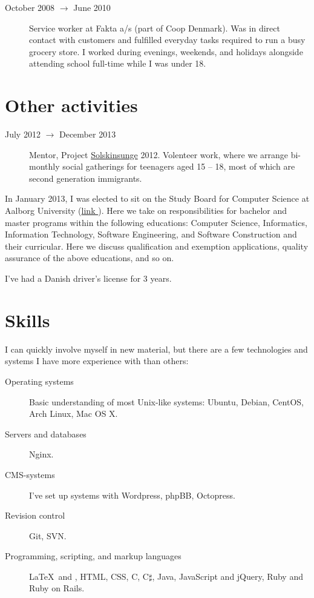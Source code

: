 \documentclass[margin,line,a4paper]{resume}
\begin{document}
\begin{resume}
\begin{description}
  \item[October 2008 $\rightarrow$ June 2010] Service worker at
    Fakta a/s (part of Coop Denmark). Was in direct contact with customers
    and fulfilled everyday tasks required to run a busy grocery store. I
    worked during evenings, weekends, and holidays alongside attending
    school full-time while I was under 18.
\end{description}

\section{\mysidestyle Other activities}\vspace{1mm}
\begin{description}
  \item[July 2012 $\rightarrow$ December 2013] Mentor, Project
    \href{http://www.urk.dk/solskinsunge/}{Solskinsunge} 2012. Volenteer
    work, where we arrange bi-monthly social gatherings for teenagers aged
    15 -- 18, most of which are second generation immigrants.
\end{description}

In January 2013, I was elected to sit on the Study
Board for Computer Science at Aalborg University
(\href{http://www.en.sict.aau.dk/Study+board+for+Computer+Science/}{link
}). Here we take on responsibilities for bachelor and master programs
within the following educations: Computer Science, Informatics,
Information Technology, Software Engineering, and Software Construction
and their curricular. Here we discuss qualification and exemption
applications, quality assurance of the above educations, and so on.

I've had a Danish driver's license for 3 years.

\section{\mysidestyle Skills} \vspace{1mm}
I can quickly involve myself in new material, but there are a few
technologies and systems I have more experience with than others:
\vspace{0.5cm}
\begin{description}
  \item[Operating systems] Basic understanding of most Unix-like
    systems: Ubuntu, Debian, CentOS, Arch Linux, Mac OS X.
  \item[Servers and databases] Nginx. 
  \item[CMS-systems] I've set up systems with Wordpress, phpBB,
    Octopress.
  \item[Revision control] Git, SVN.
  \item[Programming, scripting, and markup languages] \LaTeX\ and
    \XeTeX, HTML, CSS, C, C$\sharp$, Java, JavaScript and jQuery, Ruby
    and Ruby on Rails.
\end{description}


\end{resume}
\end{document}
